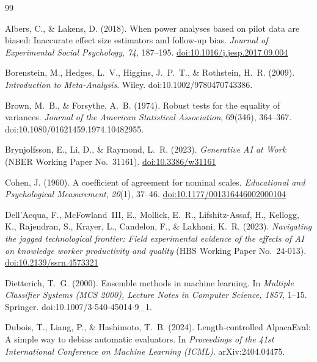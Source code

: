 \documentclass[12pt,a4paper]{article}
\begin{document}
\begin{thebibliography}{99}

Albers, C., \& Lakens, D. (2018).
When power analyses based on pilot data are biased: Inaccurate effect size
  estimators and follow-up bias.
\textit{Journal of Experimental Social Psychology}, \textit{74}, 187--195.
\href{https://doi.org/10.1016/j.jesp.2017.09.004}{doi:10.1016/j.jesp.2017.09.004}

Borenstein, M., Hedges, L.~V., Higgins, J.~P.~T., \& Rothstein, H.~R. (2009).
\emph{Introduction to Meta-Analysis}. Wiley.
doi:10.1002/9780470743386.

Brown, M.~B., \& Forsythe, A.~B. (1974). Robust tests for the equality of
variances. \emph{Journal of the American Statistical Association}, 69(346),
364--367. doi:10.1080/01621459.1974.10482955.

Brynjolfsson, E., Li, D., \& Raymond, L.~R. (2023).
\textit{Generative AI at Work} (NBER Working Paper No.~31161).
\href{https://doi.org/10.3386/w31161}{doi:10.3386/w31161}

Cohen, J. (1960).
A coefficient of agreement for nominal scales.
\textit{Educational and Psychological Measurement}, \textit{20}(1), 37--46.
\href{https://doi.org/10.1177/001316446002000104}{doi:10.1177/001316446002000104}

Dell'Acqua, F., McFowland~III, E., Mollick, E.~R., Lifshitz-Assaf, H.,
  Kellogg, K., Rajendran, S., Krayer, L., Candelon, F., \& Lakhani, K.~R.
  (2023).
\textit{Navigating the jagged technological frontier: Field experimental
  evidence of the effects of AI on knowledge worker productivity and quality}
  (HBS Working Paper No.~24-013).
\href{https://doi.org/10.2139/ssrn.4573321}{doi:10.2139/ssrn.4573321}

Dietterich, T.~G. (2000). Ensemble methods in machine learning. In
\emph{Multiple Classifier Systems (MCS 2000), Lecture Notes in Computer
Science, 1857}, 1--15. Springer. doi:10.1007/3-540-45014-9\_1.

Dubois, T., Liang, P., \& Hashimoto, T.~B. (2024). Length-controlled
AlpacaEval: A simple way to debias automatic evaluators. In
\emph{Proceedings of the 41st International Conference on Machine Learning
(ICML)}. arXiv:2404.04475.


\end{thebibliography}
\end{document}
